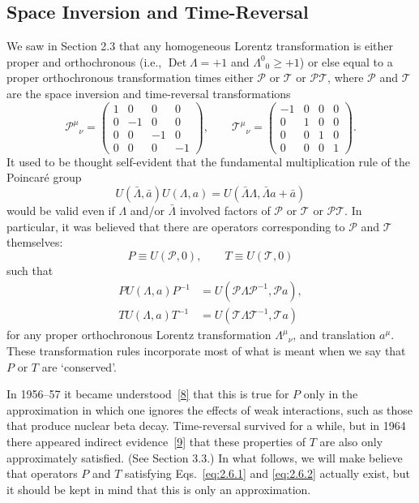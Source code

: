 
\subsection{Space Inversion and Time-Reversal}

We saw in Section 2.3 that any homogeneous Lorentz transformation is either
proper and orthochronous (i.e., $\operatorname{Det}\Lambda=+1$ and
$\Lambda^0{}_0\geq+1$) or else equal to a proper orthochronous transformation
times either $\mathcal{P}$ or $\mathcal{T}$ or $\mathcal{P}\mathcal{T}$, where
$\mathcal{P}$ and $\mathcal{T}$ are the space inversion and time-reversal
transformations
\[
\mathcal{P}^{\mu}{}_{\nu}=
\begin{pmatrix}
1&0&0&0\\
0&-1&0&0\\
0&0&-1&0\\
0&0&0&-1
\end{pmatrix},
\qquad
\mathcal{T}^{\mu}{}_{\nu}=
\begin{pmatrix}
-1&0&0&0\\
0&1&0&0\\
0&0&1&0\\
0&0&0&1
\end{pmatrix}.
\]
It used to be thought self-evident that the fundamental multiplication rule
of the Poincar\'e group
\[
U(\bar\Lambda,\bar a)U(\Lambda,a)
=U(\bar\Lambda\Lambda,\bar\Lambda a+\bar a)
\]
would be valid even if $\Lambda$ and/or $\bar\Lambda$ involved factors of
$\mathcal{P}$ or $\mathcal{T}$ or $\mathcal{P}\mathcal{T}$. In particular, it
was believed that there are operators corresponding to $\mathcal{P}$ and
$\mathcal{T}$ themselves:
\[
P\equiv U(\mathcal{P},0),
\qquad
T\equiv U(\mathcal{T},0)
\]
such that
\begin{align}
P U(\Lambda,a)P^{-1}
  &=U(\mathcal{P}\Lambda\mathcal{P}^{-1},\mathcal{P}a),
  \tag{2.6.1}\label{eq:2.6.1}\\
T U(\Lambda,a)T^{-1}
  &=U(\mathcal{T}\Lambda\mathcal{T}^{-1},\mathcal{T}a)
  \tag{2.6.2}\label{eq:2.6.2}
\end{align}
for any proper orthochronous Lorentz transformation $\Lambda^\mu{}_{\nu}$,
and translation $a^\mu$. These transformation rules incorporate most of what
is meant when we say that $P$ or $T$ are `conserved'.

In 1956--57 it became understood~\hyperref[ref:2.8]{[8]} that this is true for $P$
only in the approximation in which one ignores the effects of weak
interactions, such as those that produce nuclear beta decay. Time-reversal
survived for a while, but in 1964 there appeared indirect
evidence~\hyperref[ref:2.9]{[9]} that these properties of $T$ are also only
approximately satisfied. (See Section 3.3.) In what follows, we will make
believe that operators $P$ and $T$ satisfying Eqs.~\eqref{eq:2.6.1} and \eqref{eq:2.6.2}
actually exist, but it should be kept in mind that this is only an
approximation.

